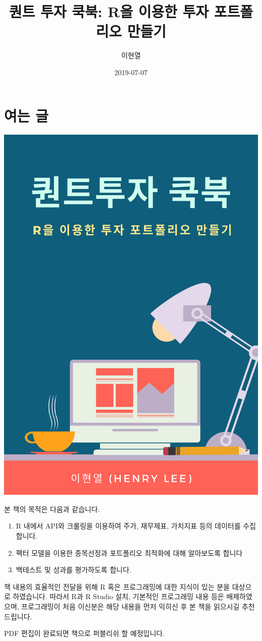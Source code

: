 \documentclass[12pt,]{book}
\title{퀀트 투자 쿡북: R을 이용한 투자 포트폴리오 만들기}
\author{이현열}
\date{2019-07-07}
\providecommand{\tightlist}{%
  \setlength{\itemsep}{0pt}\setlength{\parskip}{0pt}}
\begin{document}
\maketitle

{
\setcounter{tocdepth}{1}
\tableofcontents
}
\hypertarget{section}{%
\chapter*{여는 글}\label{section}}

\begin{center}\includegraphics[width=0.5\linewidth]{images/cover} \end{center}

본 책의 목적은 다음과 같습니다.

\begin{enumerate}
\def\labelenumi{\arabic{enumi}.}
\tightlist
\item
  R 내에서 API와 크롤링을 이용하여 주가, 재무제표, 가치지표 등의 데이터를 수집합니다.
\item
  팩터 모델을 이용한 종목선정과 포트폴리오 최적화에 대해 알아보도록 합니다
\item
  백테스트 및 성과를 평가하도록 합니다.
\end{enumerate}

책 내용의 효율적인 전달을 위해 R 혹은 프로그래밍에 대한 지식이 있는 분을 대상으로 하였습니다. 따라서 R과 R Studio 설치, 기본적인 프로그래밍 내용 등은 배제하였으며, 프로그래밍이 처음 이신분은 해당 내용을 먼저 익히신 후 본 책을 읽으시길 추천드립니다.

PDF 편집이 완료되면 책으로 퍼블리쉬 할 예정입니다.
\end{document}
